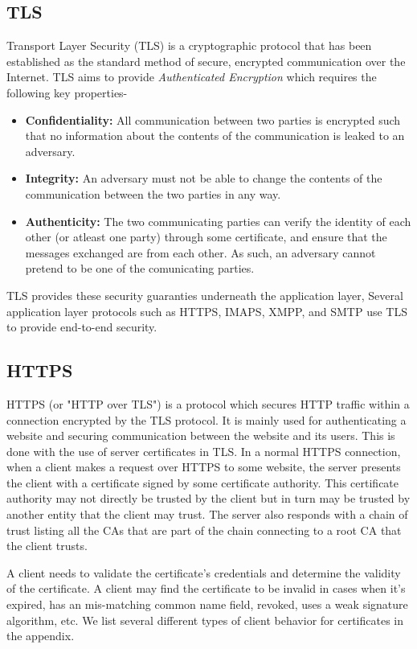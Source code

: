 \subsection{TLS}
Transport Layer Security (TLS) is a cryptographic protocol that has been
established as the standard method of secure, encrypted communication over the
Internet. TLS aims to provide \emph{Authenticated Encryption} which requires the
following key properties-
\begin{itemize}
  \item \textbf{Confidentiality:} All communication between two parties is
  encrypted such that no information about the contents of the communication is
  leaked to an adversary.

  \item \textbf{Integrity:} An adversary must not be able to change the
  contents of the communication between the two parties in any way.

  \item \textbf{Authenticity:} The two communicating parties can verify the
  identity of each other (or atleast one party) through some certificate, and
  ensure that the messages exchanged are from each other. As such, an adversary
  cannot pretend to be one of the comunicating parties.
\end{itemize}

TLS provides these security guaranties underneath the application layer,
Several application layer protocols such as HTTPS, IMAPS, XMPP, and SMTP use TLS
to provide end-to-end security.

\subsection{HTTPS}
HTTPS (or "HTTP over TLS") is a protocol which secures HTTP traffic within a
connection encrypted by the TLS protocol. It is mainly used for authenticating
a website and securing communication between the website and its users. This is
done with the use of server certificates in TLS. In a normal HTTPS connection,
when a client makes a request over HTTPS to some website, the server presents
the client with a certificate signed by some certificate authority. This certificate
authority may not directly be trusted by the client but in turn may be trusted by
another entity that the client may trust. The server also responds with a chain of
trust listing all the CAs that are part of the chain connecting to a root CA that
the client trusts.

A client needs to validate the certificate's credentials and
determine the validity of the certificate. A client may find the certificate to be
invalid in cases when it's expired, has an mis-matching common name field, revoked,
uses a weak signature algorithm, etc. We list several different types of client
behavior for certificates in the appendix.

